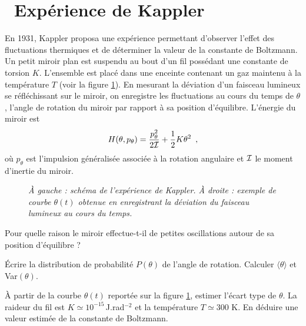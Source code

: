 \documentclass[utf8, 11pt]{feuille}
\begin{document}
\section{\medium~Expérience de Kappler}

En 1931, Kappler proposa une expérience permettant d'observer l'effet des fluctuations thermiques et de déterminer la valeur de la constante de Boltzmann. Un petit miroir plan est suspendu au bout d'un fil possédant une constante de torsion $K$. L'ensemble est placé dans une enceinte contenant un gaz maintenu à la température $T$ (voir la figure \ref{FigKappler}). En mesurant la déviation d'un faisceau lumineux se réfléchissant sur le miroir, on enregistre les fluctuations au cours du temps de $\theta$, l'angle de rotation du miroir par rapport à sa position d'équilibre. L'énergie du miroir est
$$
H(\theta, p_{\theta})=\frac{p_{\theta}^2}{2 \cal I}+
\frac{1}{2}K\theta^2 \enspace,
$$
où $p_{\theta}$ est l'impulsion généralisée associée à la rotation angulaire et $\cal I$ le moment d'inertie du miroir.


\begin{figure}[h]
\begin{center}
\caption{\it \`A gauche : schéma de l'expérience de Kappler. \`A
  droite : exemple de courbe $\theta(t)$ obtenue en enregistrant la
  déviation du faisceau lumineux au cours du temps.\label{FigKappler}}
\end{center}
\end{figure}


\question
Pour quelle raison le miroir effectue-t-il de petites oscillations autour de sa position d'équilibre ? 

\question
\'Ecrire la distribution de probabilité $P(\theta)$ de l'angle de rotation.  Calculer $\langle {\theta} \rangle$ et Var$(\theta)$.

\question
\`A partir de la courbe $\theta(t)$ reportée sur la figure \ref{FigKappler}, estimer l'écart type de $\theta$. La raideur du fil est $K\simeq 10^{-15}$\,J.rad$^{-2}$ et la température $T\simeq 300$ K. En déduire une valeur estimée de la constante de Boltzmann. 
  
\end{document}
